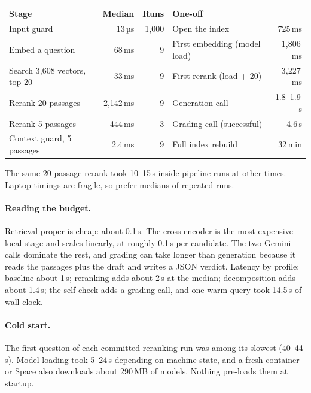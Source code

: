 \begin{measured}
\begin{center}\small
\begin{tabular}{@{}lrr@{\qquad}lr@{}}
\toprule
\textbf{Stage} & \textbf{Median} & \textbf{Runs} & \textbf{One-off} & \\
\midrule
Input guard & 13\,µs & 1,000 & Open the index & 725\,ms\\
Embed a question & 68\,ms & 9 & First embedding (model load) & 1,806\,ms\\
Search 3,608 vectors, top 20 & 33\,ms & 9 & First rerank (load + 20) & 3,227\,ms\\
Rerank 20 passages & 2,142\,ms & 9 & Generation call & 1.8--1.9\,s\\
Rerank 5 passages & 444\,ms & 3 & Grading call (successful) & 4.6\,s\\
Context guard, 5 passages & 2.4\,ms & 9 & Full index rebuild & 32\,min\\
\bottomrule
\end{tabular}
\end{center}
The same 20-passage rerank took 10--15\,s inside pipeline runs at other times. Laptop timings are fragile, so prefer medians of repeated runs.
\end{measured}

\paragraph{Reading the budget.} Retrieval proper is cheap: about 0.1\,s. The cross-encoder is the most expensive local stage and scales linearly, at roughly 0.1\,s per candidate. The two Gemini calls dominate the rest, and grading can take longer than generation because it reads the passages plus the draft and writes a JSON verdict. Latency by profile: baseline about 1\,s; reranking adds about 2\,s at the median; decomposition adds about 1.4\,s; the self-check adds a grading call, and one warm  query took 14.5\,s of wall clock.

\paragraph{Cold start.} The first question of each committed reranking run was among its slowest (40--44\,s). Model loading took 5--24\,s depending on machine state, and a fresh container or Space also downloads about 290\,MB of models. Nothing pre-loads them at startup.

